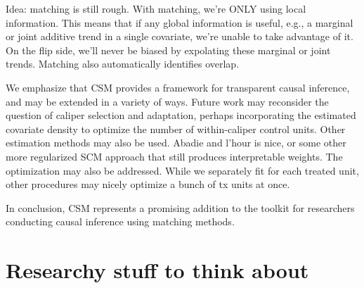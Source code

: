 \documentclass{article}
\begin{document}
Idea: matching is still rough.
With matching, we're ONLY using local information.
This means that if any global information is useful, e.g., a marginal or joint additive trend in a single covariate, we're unable to take advantage of it.
On the flip side, we'll never be biased by expolating these marginal or joint trends.
Matching also automatically identifies overlap.

We emphasize that CSM provides a framework for transparent causal inference, and may be extended in a variety of ways.
Future work may reconsider the question of caliper selection and adaptation, perhaps incorporating the estimated covariate density to optimize the number of within-caliper control units.
Other estimation methods may also be used.
Abadie and l'hour is nice, or some other more regularized SCM approach that still produces interpretable weights. 
The optimization may also be addressed.
While we separately fit for each treated unit, other procedures may nicely optimize a bunch of tx units at once.

In conclusion, CSM represents a promising addition to the toolkit for researchers conducting causal inference using matching methods.


\section{Researchy stuff to think about}
\end{document}
